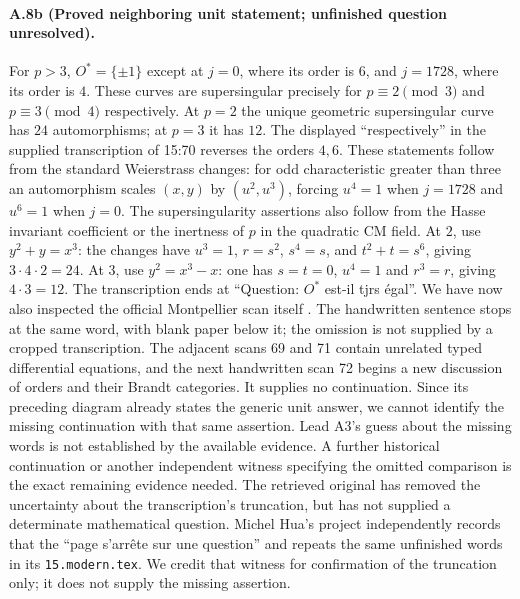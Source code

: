\paragraph{A.8b (Proved neighboring unit statement; unfinished question unresolved).}
For $p>3$, $O^*=\{\pm1\}$ except at $j=0$, where its order is $6$,
and $j=1728$, where its order is $4$. These curves are supersingular
precisely for $p\equiv2\pmod3$ and $p\equiv3\pmod4$ respectively.
At $p=2$ the unique geometric supersingular curve has $24$
automorphisms; at $p=3$ it has $12$. The displayed ``respectively''
in the supplied transcription of 15:70 reverses the orders $4,6$.
These statements follow from the standard Weierstrass changes: for
odd characteristic greater than three an automorphism scales
$(x,y)$ by $(u^2,u^3)$, forcing $u^4=1$ when $j=1728$ and $u^6=1$
when $j=0$. The supersingularity assertions also follow from the
Hasse invariant coefficient or the inertness of $p$ in the quadratic
CM field. At $2$, use $y^2+y=x^3$: the changes have $u^3=1$,
$r=s^2$, $s^4=s$, and $t^2+t=s^6$, giving $3\cdot4\cdot2=24$.
At $3$, use $y^2=x^3-x$: one has $s=t=0$, $u^4=1$ and $r^3=r$,
giving $4\cdot3=12$.
The transcription ends at ``Question: $O^*$ est-il tjrs égal''.
We have now also inspected the official Montpellier scan itself
\citep[cote 15, scan 70, archive sheet 69]{GrothendieckCote15Scan}.
The handwritten sentence stops at the same word, with blank paper
below it; the omission is not supplied by a cropped transcription.
The adjacent scans 69 and 71 contain unrelated typed differential
equations, and the next handwritten scan 72 begins a new discussion
of orders and their Brandt categories. It supplies no continuation.
Since its preceding diagram already states the generic unit answer,
we cannot identify the missing continuation with that same assertion.
Lead A3's guess about the missing words is not established by the
available evidence. A further historical continuation or another
independent witness specifying the omitted comparison is the exact
remaining evidence needed. The retrieved original has removed the
uncertainty about the transcription's truncation, but has not supplied
a determinate mathematical question.
Michel Hua's project independently records that the ``page s'arrête
sur une question'' and repeats the same unfinished words in its
\texttt{15.modern.tex}. We credit that witness for confirmation of
the truncation only; it does not supply the missing assertion.

